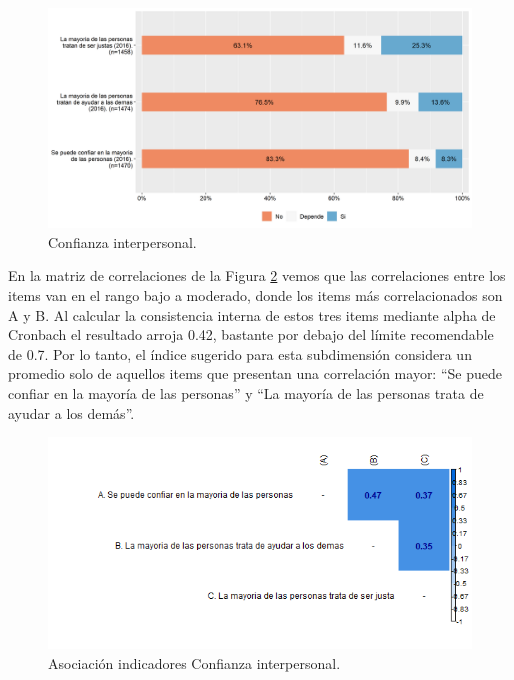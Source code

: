 \documentclass[
  12pt,
]{book}
\begin{document}
\begin{figure}[H]

{\centering \includegraphics[width=1\linewidth,height=1\textheight]{output/graphs/confianza-interpersonal} 

}

\caption{Confianza interpersonal.}\label{fig:confianza-interpersonal}
\end{figure}

En la matriz de correlaciones de la Figura \ref{fig:confianza-interpersonal-cor} vemos que las correlaciones entre los items van en el rango bajo a moderado, donde los items más correlacionados son A y B. Al calcular la consistencia interna de estos tres items mediante alpha de Cronbach el resultado arroja 0.42, bastante por debajo del límite recomendable de 0.7. Por lo tanto, el índice sugerido para esta subdimensión considera un promedio solo de aquellos items que presentan una correlación mayor: ``Se puede confiar en la mayoría de las personas'' y ``La mayoría de las personas trata de ayudar a los demás''.

\begin{figure}[H]

{\centering \includegraphics[width=1\linewidth,height=1\textheight]{output/graphs/confianza-interpersonal_cor} 

}

\caption{Asociación indicadores Confianza interpersonal.}\label{fig:confianza-interpersonal-cor}
\end{figure}
\end{document}
